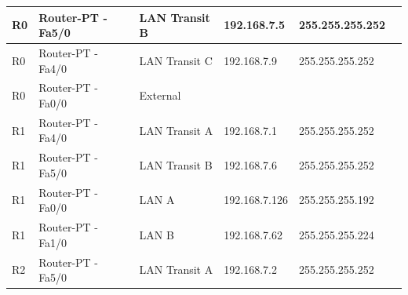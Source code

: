 \documentclass[11pt,a4paper]{report}
\begin{document}
\begin{table}[]
\begin{tabular}{llllll}
R0                                        & Router-PT - Fa5/0                           & LAN Transit B                                & 192.168.7.5                             & 255.255.255.252                                  &                                              \\ \hline
R0                                        & Router-PT - Fa4/0                           & LAN Transit C                                & 192.168.7.9                             & 255.255.255.252                                  &                                              \\ \hline
R0                                        & Router-PT - Fa0/0                           & External                                     &                                         &                                                  &                                              \\ \hline
R1                                        & Router-PT - Fa4/0                           & LAN Transit A                                & 192.168.7.1                             & 255.255.255.252                                  &                                              \\ \hline
R1                                        & Router-PT - Fa5/0                           & LAN Transit B                                & 192.168.7.6                             & 255.255.255.252                                  &                                              \\ \hline
R1                                        & Router-PT - Fa0/0                           & LAN A                                        & 192.168.7.126                           & 255.255.255.192                                  &                                              \\ \hline
R1                                        & Router-PT - Fa1/0                           & LAN B                                        & 192.168.7.62                            & 255.255.255.224                                  &                                              \\ \hline
R2                                        & Router-PT - Fa5/0                           & LAN Transit A                                & 192.168.7.2                             & 255.255.255.252                                  &                                              \\ \hline

\end{tabular}
\end{table}
\end{document}
